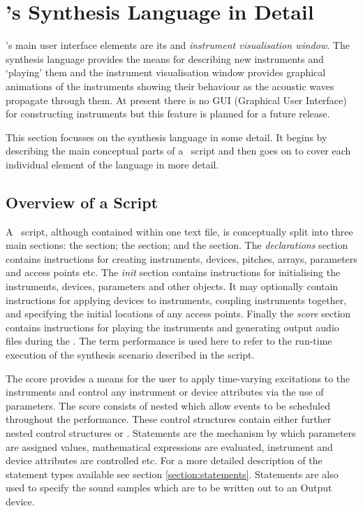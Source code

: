 \chapter{\tao's Synthesis Language in Detail}
\tao's main user interface elements are its 
and \emph{instrument visualisation window}.
The synthesis language provides
the means for describing new instruments and `playing' them
and the instrument visualisation window provides graphical animations of
the instruments showing their behaviour as the acoustic waves propagate
through them. At present there is no GUI (Graphical User Interface) for
constructing instruments but this feature is planned for a future release.

This section focusses on the synthesis language in some detail. It begins by 
describing the main conceptual parts of a \tao\ script and then goes on to
cover each individual element of the language in more detail.

\section{Overview of a Script}
A \tao\ script, although contained within one text file, is conceptually
split into three main sections: the  section;
the  section; and the  section. The
\emph{declarations} section contains instructions for creating instruments,
devices, pitches, arrays, parameters and access points etc. The
\emph{init} section contains instructions for initialising the instruments,
devices, parameters and other objects. It may optionally contain
instructions for applying devices to instruments, coupling instruments
together, and specifying the initial locations of any access points. Finally
the \emph{score} section contains instructions for playing the instruments
and generating output audio files during the . The term
performance is used here to refer to the run-time execution of the synthesis
scenario described in the script.

The score provides a means for the user to apply time-varying excitations
to the instruments and control any instrument or device attributes via
the use of parameters. The score consists of nested
 which allow events to be scheduled throughout
the performance. These control structures contain either further nested
control structures or . Statements are the mechanism
by which parameters are assigned values, mathematical expressions are
evaluated, instrument and device attributes are controlled etc. For a
more detailed description of the statement types available see
section \ref{section:statements}. 
Statements are also used to specify the sound samples which are to
be written out to an Output device.
 
